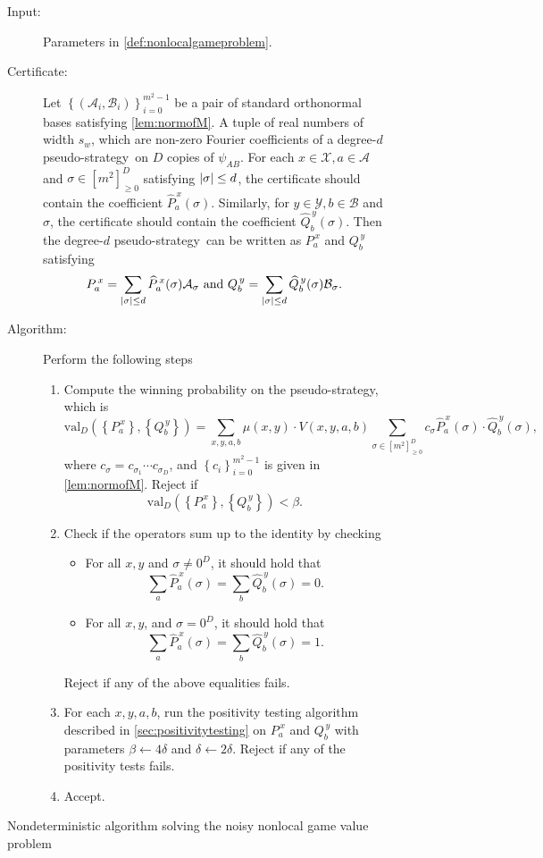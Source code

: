 \documentclass[10pt,a4paper]{article}
\theoremstyle{plain}
\theoremstyle{definition}
\newcommand {\set} [1] {\ensuremath{ \left\lbrace #1 \right\rbrace }}
\newcommand {\br} [1] {\ensuremath{ \left( #1 \right) }}
\DeclarePairedDelimiter{\abs}{\lvert}{\rvert}
\newenvironment{Algorithm}{\begin{framed}}{\end{framed}}
\newcommand{\gval}[3]{\ensuremath{\mathrm{val}_{#1}\br{\set{#2},\set{#3}}}}
\newcommand{\dlbo} {\ensuremath{{D}}}
\newcommand{\dldd} {\ensuremath{{d}}}
\newcommand{\pseudostrategy} {pseudo-strategy}
\newcommand{\Pss} {\ensuremath{P^{\,x}_a}}
\newcommand{\Qss} {\ensuremath{Q^{\,y}_b}}
\newcommand{\Pff} {\ensuremath{\widehat{P}^{\,x}_a(\sigma)}}
\newcommand{\Qff} {\ensuremath{\widehat{Q}^{\,y}_b(\sigma)}}
\newcommand{\calX}{\mathcal{X}}
\newcommand{\calY}{\mathcal{Y}}
\newcommand{\calA}{\mathcal{A}}
\newcommand{\calB}{\mathcal{B}}
\newcommand{\1}{\mathbb{1}} %
\begin{document}
\begin{figure}
\begin{Algorithm}
\begin{description}
    \item[Input:]
        Parameters in \cref{def:nonlocalgameproblem}.
    \item[Certificate:]
        Let $\set{\br{\calA_i,\calB_i}}_{i=0}^{m^2-1}$ be a pair of standard orthonormal bases satisfying \cref{lem:normofM}.
        A tuple of real numbers of width $s_w$, which are non-zero Fourier coefficients of
        a degree-$\dldd$ \pseudostrategy\ on $\dlbo$ copies of $\psi_{AB}$.
        For each $x\in\calX, a\in\calA$ and $\sigma\in[m^2]_{\ge0}^\dlbo$ satisfying $\abs{\sigma}\le\dldd$,
        the certificate should contain the coefficient $\Pff$.
        Similarly, for $y\in\calY, b\in\calB$ and $\sigma$, the certificate should contain the coefficient $\Qff$.
        Then the degree-$\dldd$ \pseudostrategy\ can be written as $\Pss$ and $\Qss$ satisfying
        $$\Pss = \sum_{\abs{\sigma}\le\dldd}\Pff\calA_\sigma~\mbox{and}~\Qss = \sum_{\abs{\sigma}\le\dldd}\Qff\calB_\sigma.$$
    \item[Algorithm:] Perform the following steps
        \begin{enumerate}
          \item Compute the winning probability on the pseudo-strategy, which is 
                $$\gval{\dlbo}{\Pss}{\Qss} = \sum_{x, y, a, b}\mu(x, y)\cdot V(x, y, a, b)\sum_{\sigma\in[m^2]_{\geq 0}^D}c_{\sigma}\Pff\cdot \Qff,$$
                where $c_{\sigma}=c_{\sigma_1}\cdots c_{\sigma_D}$, and $\set{c_i}_{i=0}^{m^2-1}$ is given in \cref{lem:normofM}.
                Reject if $$\gval{\dlbo}{\Pss}{\Qss} < \beta.$$
          \item Check if the operators sum up to the identity by checking
                \begin{itemize}
                  \item For all $x, y$ and $\sigma\neq0^\dlbo$, it should hold that
                        $$\sum_{a}\Pff = \sum_b\Qff=0.$$
                  \item For all $x, y$, and $\sigma=0^\dlbo$, it should hold that
                        $$\sum_{a}\Pff=\sum_{b}\Qff=1.$$
                \end{itemize}
                Reject if any of the above equalities fails.
          \item For each $x, y, a, b$,
                run the positivity testing algorithm described in \cref{sec:positivitytesting} on $\Pss$ and $\Qss$ with parameters $\beta\gets4\delta$ and $\delta\gets2\delta$.
                Reject if any of the positivity tests fails.
          \item Accept.
        \end{enumerate}
\end{description}

\end{Algorithm}
\caption{Nondeterministic algorithm solving the noisy nonlocal game value problem}\label{fig:valuealg}
\end{figure}
\end{document}
